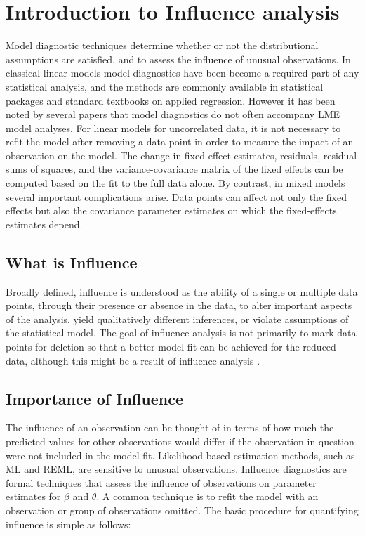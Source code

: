 \section{Introduction to Influence analysis} %
 Model diagnostic techniques determine whether or not the distributional assumptions are satisfied, and to assess the influence of unusual observations. In classical linear models model diagnostics have been become a required part of any statistical analysis, and the methods are commonly available in statistical packages and standard textbooks on applied regression. However it has been noted by several papers that model diagnostics do not often accompany LME model analyses.
For linear models for uncorrelated data, it is not necessary to refit the model after removing a data point in order to measure the impact of an observation on the model. The change in fixed effect estimates, residuals, residual sums of squares, and the variance-covariance matrix of the fixed effects can be computed based on the fit to the full data alone. By contrast, in mixed models several important complications arise. Data points can affect not only the fixed effects but also the covariance parameter estimates on which the fixed-effects estimates depend. 

\subsection{What is Influence} %


Broadly defined, influence is understood as the ability of a single or multiple data points, through their presence or absence in the data, to alter important aspects of the analysis, yield qualitatively different inferences, or violate assumptions of the statistical model. The goal of influence analysis is not primarily to mark data points for deletion so that a better model fit can be achieved for the reduced data, although this might be a result of influence analysis \citep{schabenberger}.


\subsection{Importance of Influence}
The influence of an observation can be thought of in terms of how much the predicted values for other observations would differ if the observation in question were not included in the model fit.
Likelihood based estimation methods, such as ML and REML, are sensitive to unusual observations. Influence diagnostics are formal techniques that assess the influence of observations on parameter estimates for $\beta$ and $\theta$. A common technique is to refit the model with an observation or group of observations omitted. The basic procedure for quantifying influence is simple as follows:


